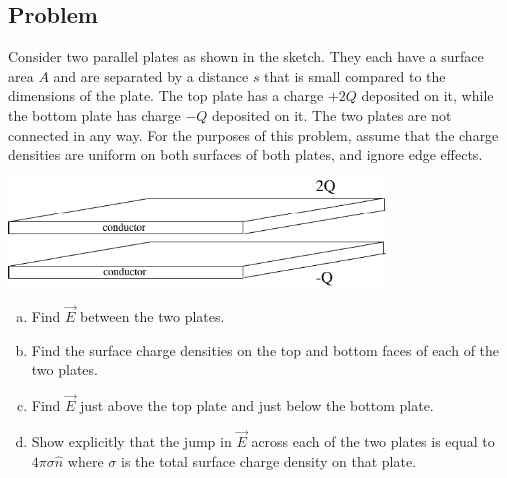 \documentclass[solutions]{esg8022pset}
\begin{document}
\subsection{Problem}
  Consider two parallel plates as shown in the sketch.  They each have a surface area $A$ and are separated by a distance $s$ that is small compared to the dimensions of the plate.  The top plate has a charge $+2Q$ deposited on it, while the bottom plate has charge $-Q$ deposited on it.  The two plates are not connected in any way.  For the purposes of this problem, assume that the charge densities are uniform on both surfaces of both plates, and ignore edge effects.
  \begin{center}\includegraphics[width=0.75\textwidth]{ps07_08}\end{center}
  \begin{enumerate}[(a)]
    \item Find $\vec E$ between the two plates.
    \item Find the surface charge densities on the top and bottom faces of each of the two plates.
    \item Find $\vec E$ just above the top plate and just below the bottom plate.
    \item Show explicitly that the jump in $\vec E$ across each of the two plates is equal to $4\pi \sigma \hat n$ where $\sigma$ is the total surface charge density on that plate.
  \end{enumerate}
\end{document}
